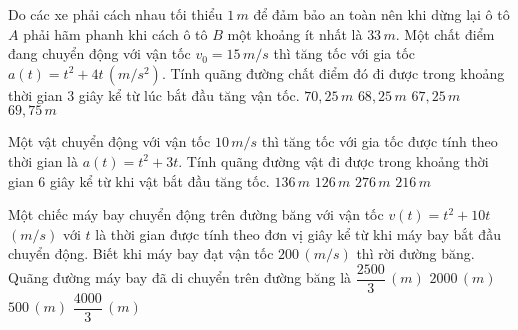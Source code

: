 \begin{ex}%
    Do các xe phải cách nhau tối thiểu $1\,m$ để đảm bảo an toàn nên khi dừng lại ô tô $A$ phải hãm phanh khi cách ô tô $B$ một khoảng ít nhất là $33\,m$. Một chất điểm đang chuyển động với vận tốc $v_0=15\,m/s$ thì tăng tốc với gia tốc $a\left(t \right)=t^2+4t\, \left(m/s^2\right)$. Tính quãng đường chất điểm đó đi được trong khoảng thời gian $3$ giây kể từ lúc bắt đầu tăng vận tốc.
    \choice
    {$70{,}25\, {m}$}
    {$68{,}25\, {m}$}
    {$67{,}25\, {m}$}
    {\True $69{,}75\, {m}$}
\end{ex}

\begin{ex}%
    Một vật chuyển động với vận tốc $10\,m/s$ thì tăng tốc với gia tốc được tính theo thời gian là $a\left(t \right)=t^2+3t$. Tính quãng đường vật đi được trong khoảng thời gian $6$ giây kể từ khi vật bắt đầu tăng tốc.
    \choice
    {$136\,{m}$}
    {$126\,{m}$}
    {$276\,{m}$}
    {\True $216\,{m}$}
\end{ex}

\begin{ex}%
    Một chiếc máy bay chuyển động trên đường băng với vận tốc $v\left(t \right)=t^2+10t$ $\left(m/s \right)$ với $t$ là thời gian được tính theo đơn vị giây kể từ khi máy bay bắt đầu chuyển động. Biết khi máy bay đạt vận tốc $200\,\left(m/s \right)$ thì rời đường băng. Quãng đường máy bay đã di chuyển trên đường băng là
    \choice
    {\True $\dfrac{2500}{3}\,\left(m \right)$}
    {$2000\,\left(m \right)$}
    {$500\,\left(m \right)$}
    {$\dfrac{4000}{3}\,\left(m \right)$}
\end{ex}

